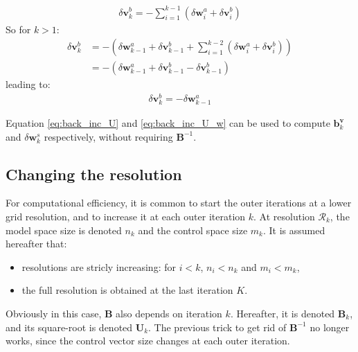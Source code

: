 \documentclass[12pt]{scrartcl}
\begin{document}
\begin{align}
\delta \mathbf{v}^b_k = - \sum_{i=1}^{k-1} \left(\delta \mathbf{w}^a_i +\delta \mathbf{v}^b_i\right)
\end{align}
So for $k>1$:
\begin{align}
\delta \mathbf{v}^b_k & = - \left(\delta \mathbf{w}^a_{k-1} + \delta \mathbf{v}^b_{k-1} + \sum_{i=1}^{k-2} \left(\delta \mathbf{w}^a_i + \delta \mathbf{v}^b_i\right)\right) \nonumber \\
& = - \left(\delta \mathbf{w}^a_{k-1} + \delta \mathbf{v}^b_{k-1} - \delta \mathbf{v}^b_{k-1}\right)
\end{align}
leading to:
\begin{align}
\label{eq:back_inc_U_w}
\boxed{\delta \mathbf{v}^b_k = - \delta \mathbf{w}^a_{k-1}}
\end{align}

Equation \eqref{eq:back_inc_U} and \eqref{eq:back_inc_U_w} can be used to compute $\mathbf{b}^\mathbf{v}_k$ and $\delta \mathbf{w}^s_k$ respectively, without requiring $\mathbf{B}^{-1}$.

\subsection{Changing the resolution}
For computational efficiency, it is common to start the outer iterations at a lower grid resolution, and to increase it at each outer iteration $k$. At resolution $\mathcal{R}_k$, the model space size is denoted $n_k$ and the control space size $m_k$. It is assumed hereafter that:
\begin{itemize}
\item resolutions are stricly increasing: for $i < k$, $n_i < n_k$ and $m_i < m_k$,
\item the full resolution is obtained at the last iteration $K$.
\end{itemize}
Obviously in this case, $\mathbf{B}$ also depends on iteration $k$. Hereafter, it is denoted $\mathbf{B}_k$, and its square-root is denoted $\mathbf{U}_k$. The previous trick to get rid of $\mathbf{B}^{-1}$ no longer works, since the control vector size changes at each outer iteration.
\end{document}
